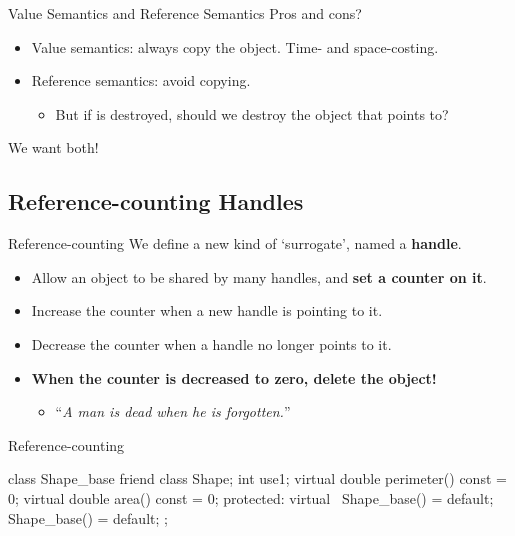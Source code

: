 \documentclass{beamer}
\begin{document}
\begin{frame}{Value Semantics and Reference Semantics}
    Pros and cons?
    \begin{itemize}
        \item Value semantics: always copy the object. Time- and space-costing.
        \item Reference semantics: avoid copying.
        \begin{itemize}
            \item But if  is destroyed, should we destroy the object that  points to?
        \end{itemize}
    \end{itemize}
    \pause
    We want both!
\end{frame}

\subsection{Reference-counting Handles}

\begin{frame}{Reference-counting}
    We define a new kind of `surrogate', named a \textbf{handle}.
    \begin{itemize}
        \item Allow an object to be shared by many handles, and \textbf{set a counter on it}.
        \item Increase the counter when a new handle is pointing to it.
        \item Decrease the counter when a handle no longer points to it.
        \item \textbf{When the counter is decreased to zero, delete the object!}
        \begin{itemize}
            \item ``\textit{A man is dead when he is forgotten.}''
        \end{itemize}
    \end{itemize}
\end{frame}

\begin{frame}[fragile]{Reference-counting}
    \begin{cpp}
class Shape_base {
  friend class Shape;
  int use{1};
  virtual double perimeter() const = 0;
  virtual double area() const = 0;
 protected:
  virtual ~Shape_base() = default;
  Shape_base() = default;
};
    \end{cpp}
\end{frame}
\end{document}
